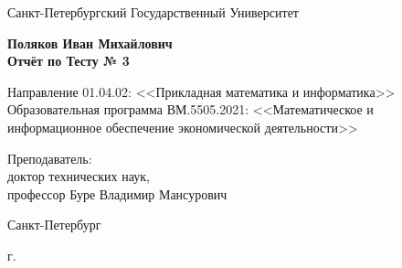\begin{titlepage}
	\begin{center}		
		Санкт-Петербургский Государственный Университет

		\vspace{35mm}
		
		\textbf{\large Поляков Иван Михайлович} \\[8mm]
		
		\textbf{\large Отчёт по Тесту № 3}\\[3mm]
		
		\vspace{20mm}
		
		Направление 01.04.02: <<Прикладная математика и информатика>>\\ 
		Образовательная программа ВМ.5505.2021: <<Математическое и информационное обеспечение экономической деятельности>> \\ [30mm]
		
		
		\begin{flushright}
			{Преподаватель:} \\
			доктор технических наук, \\ профессор Буре Владимир Мансурович
		\end{flushright}
		
		\vfill
		
		{Санкт-Петербург}
		\par{\the\year{} г.}
	\end{center}
\end{titlepage}
\restoregeometry
\addtocounter{page}{1}
